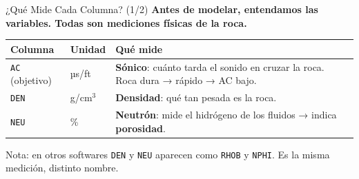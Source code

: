 \documentclass[aspectratio=169, 11pt]{beamer}
\begin{document}
\begin{frame}{¿Qué Mide Cada Columna? (1/2)}
  \vspace{-6pt}
  {\small\color{arcaDark}\bfseries
    Antes de modelar, entendamos las variables. Todas son mediciones físicas de la roca.}

  \vspace{4pt}
  \centering
  {\footnotesize
  \renewcommand{\arraystretch}{1.5}
  \begin{tabular}{@{}l l p{6.6cm}@{}}
    \toprule
    {\bfseries\color{arcaRed} Columna} & {\bfseries\color{arcaDark} Unidad}
      & {\bfseries\color{arcaDark} Qué mide} \\
    \midrule
    \rowcolor{arcaGray}
    \texttt{AC} \tiny(objetivo) & µs/ft
      & \textbf{Sónico}: cuánto tarda el sonido en cruzar la roca. Roca dura → rápido → AC bajo. \\
    \texttt{DEN} & g/cm\(^3\)
      & \textbf{Densidad}: qué tan pesada es la roca. \\
    \texttt{NEU} & \%
      & \textbf{Neutrón}: mide el hidrógeno de los fluidos → indica \textbf{porosidad}. \\
    \bottomrule
  \end{tabular}
  }

  \vspace{8pt}
  {\footnotesize\color{textMuted}
    \faLightbulb[regular]\hspace{4pt}%
    Nota: en otros softwares \texttt{DEN} y \texttt{NEU} aparecen como \texttt{RHOB} y \texttt{NPHI}.
    Es la misma medición, distinto nombre.}
\end{frame}
\end{document}
